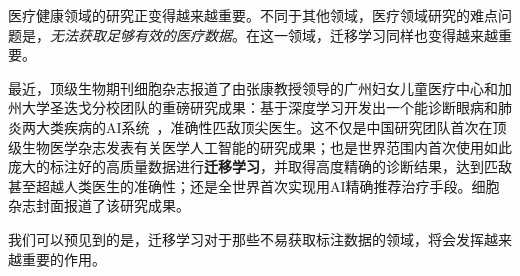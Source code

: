 医疗健康领域的研究正变得越来越重要。不同于其他领域，医疗领域研究的难点问题是，\textit{无法获取足够有效的医疗数据}。在这一领域，迁移学习同样也变得越来越重要。

最近，顶级生物期刊细胞杂志报道了由张康教授领导的广州妇女儿童医疗中心和加州大学圣迭戈分校团队的重磅研究成果：基于深度学习开发出一个能诊断眼病和肺炎两大类疾病的AI系统~\cite{kermany2018identifying}，准确性匹敌顶尖医生。这不仅是中国研究团队首次在顶级生物医学杂志发表有关医学人工智能的研究成果；也是世界范围内首次使用如此庞大的标注好的高质量数据进行\textbf{迁移学习}，并取得高度精确的诊断结果，达到匹敌甚至超越人类医生的准确性；还是全世界首次实现用AI精确推荐治疗手段。细胞杂志封面报道了该研究成果。

我们可以预见到的是，迁移学习对于那些不易获取标注数据的领域，将会发挥越来越重要的作用。
